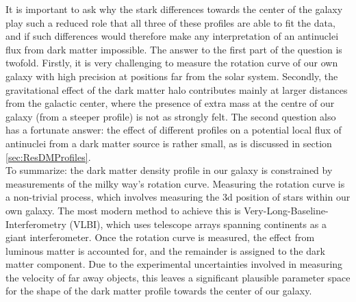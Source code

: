 It is important to ask why the stark differences towards the center of the galaxy play such a reduced role that all three of these profiles are able to fit the data, and if such differences would therefore make any interpretation of an antinuclei flux from dark matter impossible. The answer to the first part of the question is twofold. Firstly, it is very challenging to measure the rotation curve of our own galaxy with high precision at positions far from the solar system. Secondly, the gravitational effect of the dark matter halo contributes mainly at larger distances from the galactic center, where the presence of extra mass at the centre of our galaxy (from a steeper profile) is not as strongly felt. The second question also has a fortunate answer: the effect of different profiles on a potential local flux of antinuclei from a dark matter source is rather small, as is discussed in section \ref{sec:ResDMProfiles}. \\

To summarize: the dark matter density profile in our galaxy is constrained by measurements of the milky way's rotation curve. Measuring the rotation curve is a non-trivial process, which involves measuring the 3d position of stars within our own galaxy. The most modern method to achieve this is Very-Long-Baseline-Interferometry (VLBI), which uses telescope arrays spanning continents as a giant interferometer. Once the rotation curve is measured, the effect from luminous matter is accounted for, and the remainder is assigned to the dark matter component. Due to the experimental uncertainties involved in measuring the velocity of far away objects, this leaves a significant plausible parameter space for the shape of the dark matter profile towards the center of our galaxy. 


